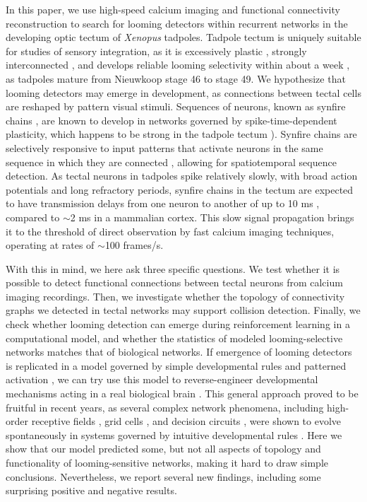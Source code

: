\documentclass{article}
\begin{document}
In this paper, we use high-speed calcium imaging and functional connectivity reconstruction to search for looming detectors within recurrent networks in the developing optic tectum of \textit{Xenopus} tadpoles. Tadpole tectum is uniquely suitable for studies of sensory integration, as it is excessively plastic \citep{pratt2007intrinsic,busch2019}, strongly interconnected \citep{james2015}, and develops reliable looming selectivity within about a week \citep{dong2009,khakhalin2014}, as tadpoles mature from Nieuwkoop stage 46 to stage 49. We hypothesize that looming detectors may emerge in development, as connections between tectal cells are reshaped by pattern visual stimuli. Sequences of neurons, known as synfire chains \citep{fiete2010chains,zheng2014synfire}, are known to develop in networks governed by spike-time-dependent plasticity, which happens to be strong in the tadpole tectum \citealt{zhang1998stdp, mu2006stdp, vislay2006rf, richards2010stdp}). Synfire chains are selectively responsive to input patterns that activate neurons in the same sequence in which they are connected \citep{clopath2010stdpcoding}, allowing for spatiotemporal sequence detection. As tectal neurons in tadpoles spike relatively slowly, with broad action potentials and long refractory periods, synfire chains in the tectum are expected to have transmission delays from one neuron to another of up to 10 ms \citep{ciarleglio2015,jang2016,busch2019}, compared to $\sim$2 ms in a mammalian cortex. This slow signal propagation brings it to the threshold of direct observation by fast calcium imaging techniques, operating at rates of $\sim$100 frames/s.

With this in mind, we here ask three specific questions. We test whether it is possible to detect functional connections between tectal neurons from calcium imaging recordings. Then, we investigate whether the topology of connectivity graphs we detected in tectal networks may support collision detection. Finally, we check whether looming detection can emerge during reinforcement learning in a computational model, and whether the statistics of modeled looming-selective networks matches that of biological networks. If emergence of looming detectors is replicated in a model governed by simple developmental rules and patterned activation \citep{pietri2017emergence, gao2015simplicity}, we can try use this model to reverse-engineer developmental mechanisms acting in a real biological brain \citep{linderman2017constrain}. This general approach proved to be fruitful in recent years, as several complex network phenomena, including high-order receptive fields \citep{bashivan2018neural}, grid cells \citep{banino2018grid}, and decision circuits \citep{haesemeyer2018convergent}, were shown to evolve spontaneously in systems governed by intuitive developmental rules \citep{bassett2018models}. Here we show that our model predicted some, but not all aspects of topology and functionality of looming-sensitive networks, making it hard to draw simple conclusions. Nevertheless, we report several new findings, including some surprising positive and negative results.
\end{document}
